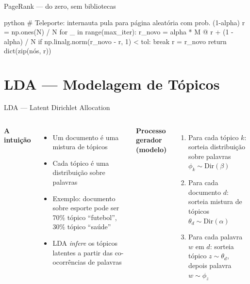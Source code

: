 \documentclass[xcolor=dvipsnames,t,aspectratio=169]{beamer}
\newcommand{\highlight}[1]{{\color{nes_dark_orange} #1}}
\begin{document}
\begin{frame}[c, fragile]{PageRank — do zero, sem bibliotecas}

\begin{code}{python}
    # Teleporte: internauta pula para página aleatória com prob. (1-alpha)
    r = np.ones(N) / N
    for _ in range(max_iter):
        r_novo = alpha * M @ r + (1 - alpha) / N
        if np.linalg.norm(r_novo - r, 1) < tol:
            break
        r = r_novo
    return dict(zip(nós, r))
\end{code}
\end{frame}



\section{LDA — Modelagem de Tópicos}

\begin{frame}[c]{LDA — Latent Dirichlet Allocation}

\begin{columns}
\textbf{\color{nes_dark_purple}A intuição}
\begin{itemize}
    \item Um documento é uma \highlight{mistura de tópicos}
    \item Cada tópico é uma \highlight{distribuição sobre palavras}
    \item Exemplo: documento sobre esporte pode ser 70\% tópico ``futebol'', 30\% tópico ``saúde''
    \item LDA \emph{infere} os tópicos latentes a partir das co-ocorrências de palavras
\end{itemize}



\textbf{\color{nes_dark_purple}Processo gerador (modelo)}
\begin{enumerate}
    \item Para cada tópico $k$: sorteia distribuição sobre palavras $\phi_k \sim \text{Dir}(\beta)$
    \item Para cada documento $d$: sorteia mistura de tópicos $\theta_d \sim \text{Dir}(\alpha)$
    \item Para cada palavra $w$ em $d$: sorteia tópico $z \sim \theta_d$, depois palavra $w \sim \phi_z$
\end{enumerate}
\end{columns}
\end{frame}
\end{document}
